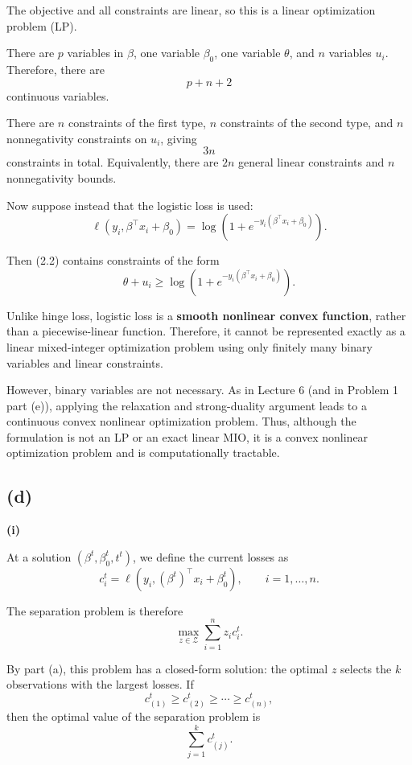\documentclass{article}
\begin{document}
The objective and all constraints are linear, so this is a linear
optimization problem (LP).


\newpage
There are $p$ variables in $\beta$, one variable $\beta_0$, one variable
$\theta$, and $n$ variables $u_i$. Therefore, there are
\[
\boxed{p+n+2}
\]
continuous variables.

There are $n$ constraints of the first type, $n$ constraints of the
second type, and $n$ nonnegativity constraints on $u_i$, giving
\[
\boxed{3n}
\]
constraints in total. Equivalently, there are $2n$ general linear
constraints and $n$ nonnegativity bounds.


\vspace{5mm}

Now suppose instead that the logistic loss is used:
\[
\ell(y_i,\beta^\top x_i+\beta_0)
=
\log\left(
1+e^{-y_i(\beta^\top x_i+\beta_0)}
\right).
\]

Then (2.2) contains constraints of the form
\[
\theta+u_i
\geq
\log\left(
1+e^{-y_i(\beta^\top x_i+\beta_0)}
\right).
\]

Unlike hinge loss, logistic loss is a \textbf{smooth nonlinear convex function},
rather than a piecewise-linear function. Therefore, it cannot be
represented exactly as a linear mixed-integer optimization problem using
only finitely many binary variables and linear constraints.

However, binary variables are not necessary. As in Lecture 6 (and in Problem 1 part (e)), applying
the relaxation and strong-duality argument leads to a continuous convex
nonlinear optimization problem. Thus, although the formulation is not
an LP or an exact linear MIO, it is a convex nonlinear optimization
problem and is computationally tractable.


\vspace{5mm}

\subsection*{(d)}


\textbf{(i)}

At a solution $(\beta^t,\beta_0^t,t^t)$, we define the current
losses as
\[
c_i^t
=
\ell\left(y_i,(\beta^t)^\top x_i+\beta_0^t\right),
\qquad i=1,\ldots,n.
\]

The separation problem is therefore 
\[
\max_{z\in\mathcal Z}
\sum_{i=1}^n z_i c_i^t.
\]

By part (a), this problem has a closed-form solution: the optimal $z$
selects the $k$ observations with the largest losses. If
\[
c_{(1)}^t\geq c_{(2)}^t\geq\cdots\geq c_{(n)}^t,
\]
then the optimal value of the separation problem is
\[
\sum_{j=1}^k c_{(j)}^t.
\]
\end{document}
